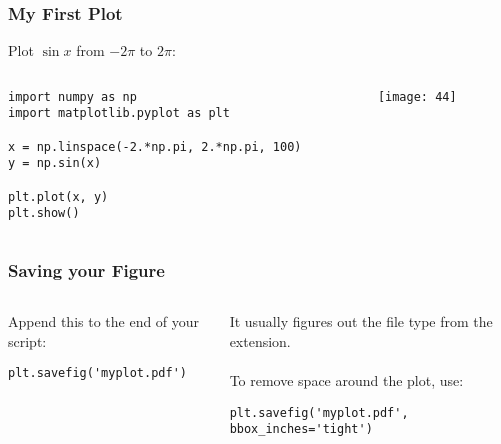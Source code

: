 \begin{frame}[fragile]\frametitle{My First Plot}

    Plot $\sin x$ from $-2\pi$ to $2\pi$:
	
	
\begin{columns}
    \begin{column}[T]{0.6\linewidth}

        \begin{lstlisting}
import numpy as np
import matplotlib.pyplot as plt

x = np.linspace(-2.*np.pi, 2.*np.pi, 100)
y = np.sin(x)

plt.plot(x, y)
plt.show()
        \end{lstlisting}

    \end{column}
    \begin{column}[T]{0.4\linewidth}

\begin{center}
\texttt{[image: 44]}
\end{center}

    \end{column}
  \end{columns}
  


\end{frame}

\begin{frame}[fragile]\frametitle{Saving your Figure}


\begin{columns}
    \begin{column}[T]{0.6\linewidth}

    Append this to the end of your script:
    \begin{lstlisting}
plt.savefig('myplot.pdf')
    \end{lstlisting}

    \end{column}
    \begin{column}[T]{0.4\linewidth}

    It usually figures out the file type from the extension.
    \\~\\
    To remove space around the plot, use:
    \begin{lstlisting}
plt.savefig('myplot.pdf', bbox_inches='tight')
    \end{lstlisting}

    \end{column}
  \end{columns}
  
  



\end{frame}

